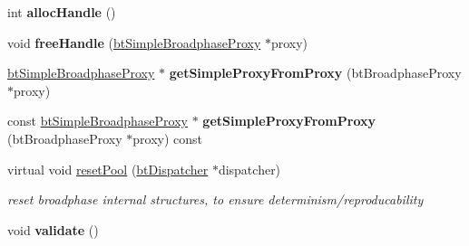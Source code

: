 \begin{DoxyCompactItemize}
\item 
\hypertarget{classbt_simple_broadphase_a8d01b4c49e93f64469f20dab03109454}{int {\bfseries alloc\+Handle} ()}\label{classbt_simple_broadphase_a8d01b4c49e93f64469f20dab03109454}

\item 
\hypertarget{classbt_simple_broadphase_a3a5bbfbcb61d3236acc05da1e59dfee6}{void {\bfseries free\+Handle} (\hyperlink{structbt_simple_broadphase_proxy}{bt\+Simple\+Broadphase\+Proxy} $\ast$proxy)}\label{classbt_simple_broadphase_a3a5bbfbcb61d3236acc05da1e59dfee6}

\item 
\hypertarget{classbt_simple_broadphase_a1dd4dc9f2796655cf967d7bb9251bd2f}{\hyperlink{structbt_simple_broadphase_proxy}{bt\+Simple\+Broadphase\+Proxy} $\ast$ {\bfseries get\+Simple\+Proxy\+From\+Proxy} (bt\+Broadphase\+Proxy $\ast$proxy)}\label{classbt_simple_broadphase_a1dd4dc9f2796655cf967d7bb9251bd2f}

\item 
\hypertarget{classbt_simple_broadphase_acbe58f465607d45fe1bc21de3de11393}{const \hyperlink{structbt_simple_broadphase_proxy}{bt\+Simple\+Broadphase\+Proxy} $\ast$ {\bfseries get\+Simple\+Proxy\+From\+Proxy} (bt\+Broadphase\+Proxy $\ast$proxy) const }\label{classbt_simple_broadphase_acbe58f465607d45fe1bc21de3de11393}

\item 
\hypertarget{classbt_simple_broadphase_a65c387ba0fa8690716296ee9d5f7550a}{virtual void \hyperlink{classbt_simple_broadphase_a65c387ba0fa8690716296ee9d5f7550a}{reset\+Pool} (\hyperlink{classbt_dispatcher}{bt\+Dispatcher} $\ast$dispatcher)}\label{classbt_simple_broadphase_a65c387ba0fa8690716296ee9d5f7550a}

\begin{DoxyCompactList}\small\item\em reset broadphase internal structures, to ensure determinism/reproducability \end{DoxyCompactList}\item 
\hypertarget{classbt_simple_broadphase_af866dab98556727f621a3e257ed8ff8f}{void {\bfseries validate} ()}\label{classbt_simple_broadphase_af866dab98556727f621a3e257ed8ff8f}

\end{DoxyCompactItemize}
